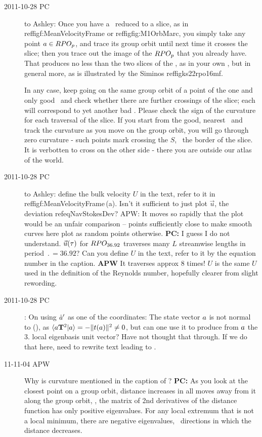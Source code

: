 \begin{description}
\medskip


\item[2011-10-28 PC~~] to Ashley: Once you have a \rpo\ reduced to a
slice, as in  reffig{f:MeanVelocityFrame} or  reffig{fig:M1OrbMarc}, you
simply take any point $a \in RPO_{p}$, and trace its group orbit until
next time it crosses the slice; then you trace out the image of the
$RPO_{p}$ that you already have. That produces no less than the two slices of
the \rpo, as in your own , but in general more, as is
illustrated by the Siminos  reffig{ks22rpo16mf}.

In any case, keep going on the same group orbit of a point of the one and
only good \po\ and check whether there are further crossings of the
slice; each will correspond to yet another bad \po. Please check the sign
of the curvature for each traversal of the slice. If you
start from the good, nearest \po\ and track the curvature as you move on
the group orbit, you will go through zero curvature - such points mark
crossing the {\chartBord} $S$, \ie\ the border of the slice. It is verbotten
to cross on the other side - there you are outside our atlas of the
world.

\item[2011-10-28 PC~~] to Ashley:
    define the bulk velocity $U$ in the text, refer to it in
     reffig{f:MeanVelocityFrame}\,{(a)}. Isn't it sufficient to just plot
    $\vec{u}$, the deviation  refeq{NavStokesDev}? APW: It moves so
    rapidly that the plot would be an unfair comparison -- points
    sufficiently close to make smooth curves here plot as random points
    otherwise.  {\bf PC:}  I guess I do not understand. $\vec{u}(\tau)$
    for $RPO_{36.92}$ traverses many $L$ streamwise lengths in period
    $\period{}=36.92$? Can you define $U$ in the text, refer to it by the
    equation number in the caption.
    {\bf APW} It traverses approx 8 times!  $U$ is the same $U$ used
    in the definition of the Reynolds number, hopefully clearer from
    slight rewording.

\item[2011-10-28 PC~~]: On using $\hat{a}'$ as one of the coordinates: The
state vector $a$ is not normal to \normVec(\ssp), as $\braket{\ssp
\Lg^2}{\ssp} = - \Norm{\groupTan(\ssp)}^2 \neq 0$, but can one use it to
produce from $a$ the 3. local eigenbasis unit vector? Have not thought
that through. If we do that here, need to rewrite text leading to
.

\item[11-11-04 APW~~] Why is curvature mentioned in the caption of
? {\bf PC:} As you look at the closest point on a
group orbit, distance increases in all moves away from it along the group
orbit, \ie, the matrix of 2nd derivatives of the distance function has
only positive eigenvalues. For any local extremum that is not a local
minimum, there are negative eigenvalues, \ie\ directions in which the
distance decreases.


\end{description}
